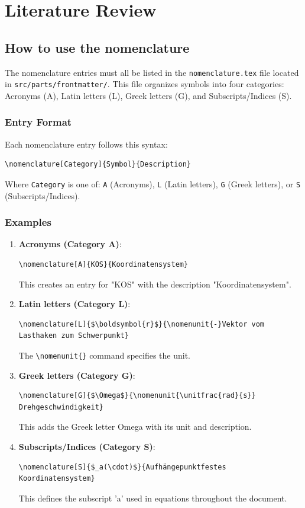 \chapter{Literature Review}

\section{How to use the nomenclature}

The nomenclature entries must all be listed in the \texttt{nomenclature.tex} file located in \texttt{src/parts/frontmatter/}. This file organizes symbols into four categories: Acronyms (A), Latin letters (L), Greek letters (G), and Subscripts/Indices (S).

\subsection*{Entry Format}
Each nomenclature entry follows this syntax:
\begin{verbatim}
\nomenclature[Category]{Symbol}{Description}
\end{verbatim}

Where \texttt{Category} is one of: \texttt{A} (Acronyms), \texttt{L} (Latin letters), \texttt{G} (Greek letters), or \texttt{S} (Subscripts/Indices).

\subsection*{Examples}

\begin{enumerate}
    \item \textbf{Acronyms (Category A)}:
    \begin{verbatim}
\nomenclature[A]{KOS}{Koordinatensystem}
    \end{verbatim}
    This creates an entry for "KOS" with the description "Koordinatensystem".
    
    \item \textbf{Latin letters (Category L)}:
    \begin{verbatim}
\nomenclature[L]{$\boldsymbol{r}$}{\nomenunit{-}Vektor vom Lasthaken zum Schwerpunkt}
    \end{verbatim}
    The \texttt{\textbackslash nomenunit\{\}} command specifies the unit.
    
    \item \textbf{Greek letters (Category G)}:
    \begin{verbatim}
\nomenclature[G]{$\Omega$}{\nomenunit{\unitfrac{rad}{s}} Drehgeschwindigkeit}
    \end{verbatim}
    This adds the Greek letter Omega with its unit and description.
    
    \item \textbf{Subscripts/Indices (Category S)}:
    \begin{verbatim}
\nomenclature[S]{$_a(\cdot)$}{Aufhängepunktfestes Koordinatensystem}
    \end{verbatim}
    This defines the subscript 'a' used in equations throughout the document.
\end{enumerate}

